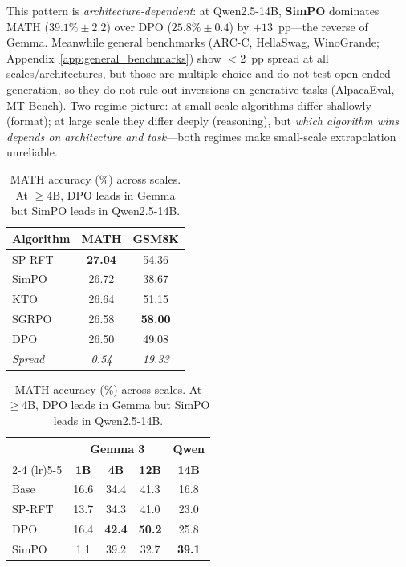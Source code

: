 \documentclass{article}
\newcommand{\sprft}{SP-RFT}
\begin{document}
This pattern is \emph{architecture-dependent}: at Qwen2.5-14B, \textbf{SimPO} dominates MATH ($39.1\%\pm 2.2$) over DPO ($25.8\%\pm 0.4$) by $+13$~pp---the reverse of Gemma. Meanwhile general benchmarks (ARC-C, HellaSwag, WinoGrande; Appendix~\ref{app:general_benchmarks}) show $<$2~pp spread at all scales/architectures, but those are multiple-choice and do not test open-ended generation, so they do not rule out inversions on generative tasks (AlpacaEval, MT-Bench). Two-regime picture: at small scale algorithms differ shallowly (format); at large scale they differ deeply (reasoning), but \emph{which algorithm wins depends on architecture and task}---both regimes make small-scale extrapolation unreliable.

\begin{table}[t]
\begin{minipage}[t]{0.48\textwidth}
\centering
\caption{Cross-task comparison at 1.5B: GSM8K vs.\ MATH. The 19.3~pp spread collapses to 0.54~pp ($36\times$ compression).}
\label{tab:math_results}
\small
\begin{tabular}{@{}lcc@{}}
\toprule
\textbf{Algorithm} & \textbf{MATH} & \textbf{GSM8K} \\
\midrule
\sprft{} & \textbf{27.04} & 54.36 \\
SimPO & 26.72 & 38.67 \\
KTO & 26.64 & 51.15 \\
SGRPO & 26.58 & \textbf{58.00} \\
DPO & 26.50 & 49.08 \\
\midrule
\textit{Spread} & \textit{0.54} & \textit{19.33} \\
\bottomrule
\end{tabular}
\end{minipage}
\hfill
\begin{minipage}[t]{0.50\textwidth}
\centering
\caption{MATH accuracy (\%) across scales. At $\geq$4B, DPO leads in Gemma but SimPO leads in Qwen2.5-14B.}
\label{tab:math_scaling}
\small
\begin{tabular}{@{}lcccc@{}}
\toprule
& \multicolumn{3}{c}{\textbf{Gemma 3}} & \textbf{Qwen} \\
\cmidrule(lr){2-4} \cmidrule(lr){5-5}
& \textbf{1B} & \textbf{4B} & \textbf{12B} & \textbf{14B} \\
\midrule
Base & 16.6 & 34.4 & 41.3 & 16.8 \\
\sprft{} & 13.7 & 34.3 & 41.0 & 23.0 \\
DPO & 16.4 & \textbf{42.4} & \textbf{50.2} & 25.8 \\
SimPO & 1.1 & 39.2 & 32.7 & \textbf{39.1} \\
\bottomrule
\end{tabular}
\end{minipage}
\end{table}
\end{document}
